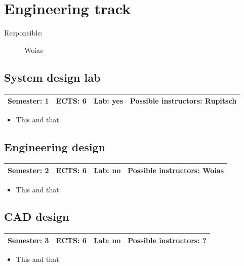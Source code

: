\documentclass[12pt,twoside,fleqn,a4paper]{article}
\begin{document}
\newpage
\section{Engineering track}
\begin{description}
\item[Responsible:] Woias
\end{description}
\vspace{1 mm}


\subsection{System design lab}
\begin{tabular}{llll} \hline
\textbf{Semester:} 1 & \textbf{ECTS:} 6 & \textbf{Lab:} yes & \textbf{Possible instructors:} Rupitsch\\
\hline
\end{tabular}

\begin{itemize}
\setlength\itemsep{0cm}
\item This and that
\end{itemize}


\subsection{Engineering design}
\begin{tabular}{llll} \hline
\textbf{Semester:} 2 & \textbf{ECTS:} 6 & \textbf{Lab:} no & \textbf{Possible instructors:} Woias\\
\hline
\end{tabular}

\begin{itemize}
\setlength\itemsep{0cm}
\item This and that
\end{itemize}


\subsection{CAD design}
\begin{tabular}{llll} \hline
\textbf{Semester:} 3 & \textbf{ECTS:} 6 & \textbf{Lab:} no & \textbf{Possible instructors:} ?\\
\hline
\end{tabular}

\begin{itemize}
\setlength\itemsep{0cm}
\item This and that
\end{itemize}
\end{document}
